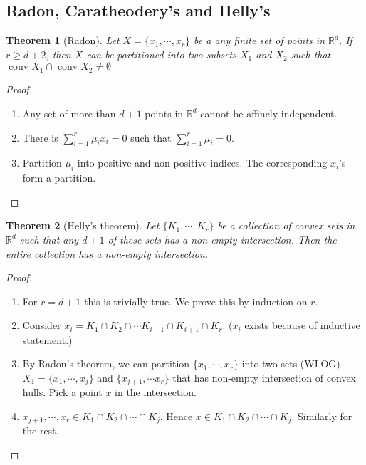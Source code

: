 \documentclass[a4paper,10pt,landscape]{article}
\newtheorem{theorem}{Theorem}[section]
\def\R{\mathbb{R}}
\def\conv{\operatorname{conv}}
\begin{document}
\begin{multicols}{3}
  \section{Radon, Caratheodery's and Helly's}
  \begin{theorem}[Radon]
    Let $X = \{x_1, \cdots, x_r\}$ be a any finite set of points in $\R^d$. If
    $r \ge d + 2$, then $X$ can be partitioned into two subsets $X_1$ and $X_2$
    such that $\conv X_1 \cap \conv X_2 \neq \emptyset$
  \end{theorem}
  \begin{proof}
    \begin{enumerate}
    \item Any set of more than $d+1$ points in $\R^d$ cannot be affinely
      independent.
    \item There is $\sum_{i=1}^{r}\mu_i x_i = 0$ such that $\sum_{i=1}^{r} \mu_i
      =0$.
    \item Partition $\mu_i$ into positive and non-positive indices. The
      corresponding $x_i$'s form a partition.
    \end{enumerate}
  \end{proof}
  
  \begin{theorem}[Helly's theorem]
    Let $\{K_1, \cdots, K_r\}$ be a collection of convex sets in $\R^d$ such
    that any $d+1$ of these sets has a non-empty intersection. Then the entire
    collection has a non-empty intersection.
  \end{theorem}
  \begin{proof}
    \begin{enumerate}
      \item For $r = d+1$ this is trivially true. We prove this by induction on
        $r$.
      \item Consider $x_i = K_1 \cap K_2 \cap \cdots K_{i-1} \cap K_{i+1} \cap
        K_{r}$. ($x_i$ exists because of inductive statement.)
      \item By Radon's theorem, we can partition $\{x_1, \cdots, x_r\}$ into two
        sets (WLOG) $X_1= \{x_1, \cdots, x_j\}$ and $\{x_{j+1}, \cdots x_r\}$
        that has non-empty intersection of convex hulls. Pick a point $x$ in the
        intersection.
      \item $x_{j+1}, \cdots, x_r \in K_1 \cap K_2 \cap \cdots \cap K_j$. Hence $x
        \in K_1 \cap K_2 \cap \cdots\cap K_j$. Similarly for the rest.
      \end{enumerate}
  \end{proof}



\end{multicols}
\end{document}

